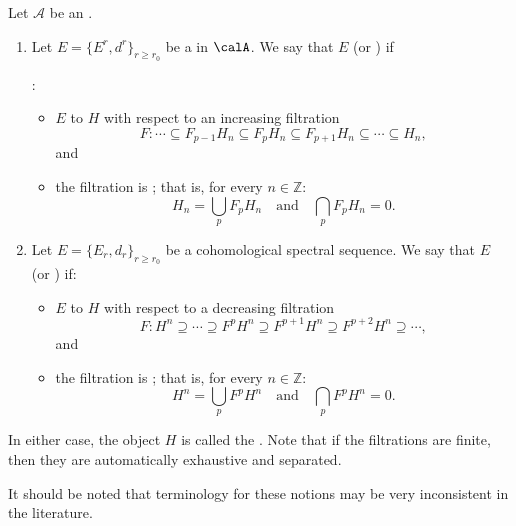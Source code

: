 \begin{definition} \label{definition:abuts_to_approaches_a_filtration_for_a_spectral_sequence_in_an_abelian_category}
    Let $\mathcal{A}$ be an .

    \begin{enumerate}
        \item Let $E = \{E^r, d^r\}_{r \ge r_0}$ be a  in $\calA$. We say that $E$  (or ) if
        
        :
        \begin{itemize}
            \item $E$  to $H$ with respect to an increasing filtration
            $$F: \cdots \subseteq F_{p-1} H_n \subseteq F_p H_n \subseteq F_{p+1} H_n \subseteq \cdots \subseteq H_n,$$
            and
            \item the filtration is ; that is, for every $n \in \mathbb{Z}$:
            $$H_n = \bigcup_p F_p H_n \quad \text{and} \quad \bigcap_p F_p H_n = 0.$$
        \end{itemize}
        \item Let $E = \{E_r, d_r\}_{r \ge r_0}$ be a cohomological spectral sequence. We say that $E$  (or ) if:
        \begin{itemize}
            \item $E$  to $H$ with respect to a decreasing filtration
            $$F: H^n \supseteq \cdots \supseteq F^p H^n \supseteq F^{p+1} H^n \supseteq F^{p+2} H^n \supseteq \cdots,$$
            and
            \item the filtration is ; that is, for every $n \in \mathbb{Z}$:
            $$H^n = \bigcup_p F^p H^n \quad \text{and} \quad \bigcap_p F^p H^n = 0.$$
        \end{itemize}
    \end{enumerate}
    In either case, the object $H$ is called the . Note that if the filtrations are finite, then they are automatically exhaustive and separated. 

    It should be noted that terminology for these notions may be very inconsistent in the literature.
\end{definition}